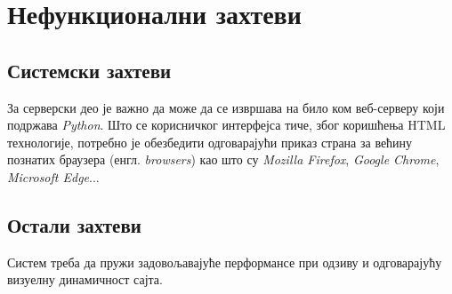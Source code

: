 \section{Нефункционални захтеви}

\subsection{Системски захтеви}

За серверски део је важно да може да се извршава на било ком веб-серверу који подржава \textit{Python}.
Што се корисничког интерфејса тиче, због коришћења HTML технологије, потребно је обезбедити одговарајући
приказ страна за већину познатих браузера (енгл. \textit{browsers}) као што су \textit{Mozilla Firefox},
\textit{Google Chrome}, \textit{Microsoft Edge}...

\subsection{Остали захтеви}

Систем треба да пружи задовољавајуће перформансе при одзиву и одговарајућу визуелну динамичност сајта.
